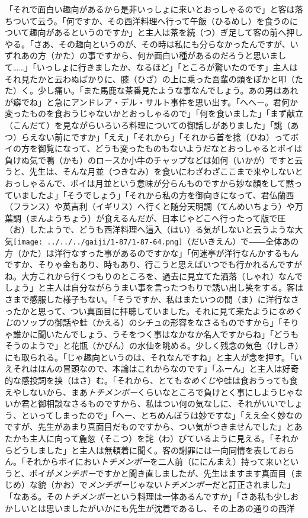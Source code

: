 \documentclass{book}
\begin{document}
「それで面白い趣向があるから是非いっしょに来いとおっしゃるので」と客は落ちついて云う。「何ですか、その西洋料理へ行って午飯（ひるめし）を食うのについて趣向があるというのですか」と主人は茶を続（つ）ぎ足して客の前へ押しやる。「さあ、その趣向というのが、その時は私にも分らなかったんですが、いずれあの方（かた）の事ですから、何か面白い種があるのだろうと思いまして\ldots{}\ldots{}」「いっしょに行きましたか、なるほど」「ところが驚いたのです」主人はそれ見たかと云わぬばかりに、膝（ひざ）の上に乗った吾輩の頭をぽかと叩（たた）く。少し痛い。「また馬鹿な茶番見たような事なんでしょう。あの男はあれが癖でね」と急にアンドレア・デル・サルト事件を思い出す。「へへー。君何か変ったものを食おうじゃないかとおっしゃるので」「何を食いました」「まず献立（こんだて）を見ながらいろいろ料理についての御話しがありました」「誂（あつ）らえない前にですか」「ええ」「それから」「それから首を捻（ひね）ってボイの方を御覧になって、どうも変ったものもないようだなとおっしゃるとボイは負けぬ気で鴨（かも）のロースか小牛のチャップなどは如何（いかが）ですと云うと、先生は、そんな月並（つきなみ）を食いにわざわざここまで来やしないとおっしゃるんで、ボイは月並という意味が分らんものですから妙な顔をして黙っていましたよ」「そうでしょう」「それから私の方を御向きになって、君仏蘭西（フランス）や英吉利（イギリス）へ行くと随分天明調（てんめいちょう）や万葉調（まんようちょう）が食えるんだが、日本じゃどこへ行ったって版で圧（お）したようで、どうも西洋料理へ這入（はい）る気がしないと云うような大気\texttt{[image: ../../../gaiji/1-87/1-87-64.png]}（だいきえん）で――全体あの方（かた）は洋行なすった事があるのですかな」「何迷亭が洋行なんかするもんですか、そりゃ金もあり、時もあり、行こうと思えばいつでも行かれるんですがね。大方これから行くつもりのところを、過去に見立てた洒落（しゃれ）なんでしょう」と主人は自分ながらうまい事を言ったつもりで誘い出し笑をする。客はさまで感服した様子もない。「そうですか、私はまたいつの間（ま）に洋行なさったかと思って、つい真面目に拝聴していました。それに見て来たように\emph{なめくじ}のソップの御話や蛙（かえる）のシチュの形容をなさるものですから」「そりゃ誰かに聞いたんでしょう、うそをつく事はなかなか名人ですからね」「どうもそうのようで」と花瓶（かびん）の水仙を眺める。少しく残念の気色（けしき）にも取られる。「じゃ趣向というのは、それなんですね」と主人が念を押す。「いえそれはほんの冒頭なので、本論はこれからなのです」「ふーん」と主人は好奇的な感投詞を挟（はさ）む。「それから、とても\emph{なめくじ}や蛙は食おうっても食えやしないから、まあ\emph{トチメンボー}くらいなところで負けとく事にしようじゃないか君と御相談なさるものですから、私はつい何の気なしに、それがいいでしょう、といってしまったので」「へー、とちめんぼうは妙ですな」「ええ全く妙なのですが、先生があまり真面目だものですから、つい気がつきませんでした」とあたかも主人に向って麁忽（そこつ）を詫（わ）びているように見える。「それからどうしました」と主人は無頓着に聞く。客の謝罪には一向同情を表しておらん。「それからボイにおい\emph{トチメンボー}を二人前（ににんまえ）持って来いというと、ボイが\emph{メンチボー}ですかと聞き直しましたが、先生はますます真面目（まじめ）な貌（かお）で\emph{メンチボー}じゃない\emph{トチメンボー}だと訂正されました」「なある。その\emph{トチメンボー}という料理は一体あるんですか」「さあ私も少しおかしいとは思いましたがいかにも先生が沈着であるし、その上あの通りの西洋
\end{document}
